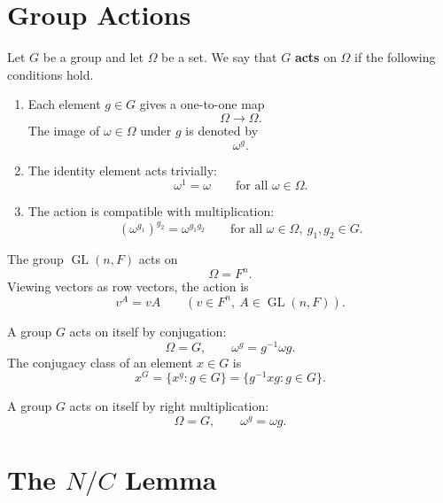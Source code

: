 \section{Group Actions}

\begin{definition}
Let $G$ be a group and let $\Omega$ be a set. We say that $G$ \textbf{acts} on $\Omega$ if the following conditions hold.

\begin{enumerate}[label=(\arabic*)]
    \item Each element $g\in G$ gives a one-to-one map
    \[
        \Omega\longrightarrow \Omega.
    \]
    The image of $\omega\in\Omega$ under $g$ is denoted by
    \[
        \omega^g.
    \]

    \item The identity element acts trivially:
    \[
        \omega^1=\omega
        \qquad
        \text{for all }\omega\in\Omega.
    \]

    \item The action is compatible with multiplication:
    \[
        (\omega^{g_1})^{g_2}
        =
        \omega^{g_1g_2}
        \qquad
        \text{for all }\omega\in\Omega,\ g_1,g_2\in G.
    \]
\end{enumerate}
\end{definition}

\begin{example}
The group $\operatorname{GL}(n,F)$ acts on
\[
    \Omega=F^n.
\]
Viewing vectors as row vectors, the action is
\[
    v^A=vA
    \qquad
    (v\in F^n,\ A\in\operatorname{GL}(n,F)).
\]
\end{example}

\begin{example}
A group $G$ acts on itself by conjugation:
\[
    \Omega=G,
    \qquad
    \omega^g=g^{-1}\omega g.
\]
The conjugacy class of an element $x\in G$ is
\[
    x^G
    =
    \{x^g:g\in G\}
    =
    \{g^{-1}xg:g\in G\}.
\]
\end{example}

\begin{example}
A group $G$ acts on itself by right multiplication:
\[
    \Omega=G,
    \qquad
    \omega^g=\omega g.
\]
\end{example}

\section{The \texorpdfstring{$N/C$}{N/C} Lemma}

